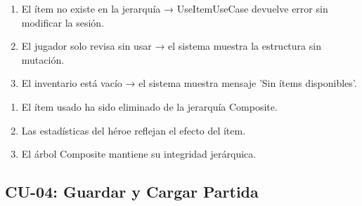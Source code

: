 \documentclass[stu,12pt,floatsintext]{apa7}
\begin{document}
\begin{description}
        \begin{enumerate}[label=FA-\arabic*:]
            \item El ítem no existe en la jerarquía → UseItemUseCase devuelve error sin modificar la sesión.
            \item El jugador solo revisa sin usar → el sistema muestra la estructura sin mutación.
            \item El inventario está vacío → el sistema muestra mensaje 'Sin ítems disponibles'.
        \end{enumerate}
    \item[Poscondiciones:] \hfill
        \begin{enumerate}[label=\arabic*.]
            \item El ítem usado ha sido eliminado de la jerarquía Composite.
            \item Las estadísticas del héroe reflejan el efecto del ítem.
            \item El árbol Composite mantiene su integridad jerárquica.
        \end{enumerate}
\end{description}


\subsection{CU-04: Guardar y Cargar Partida}
\end{document}
